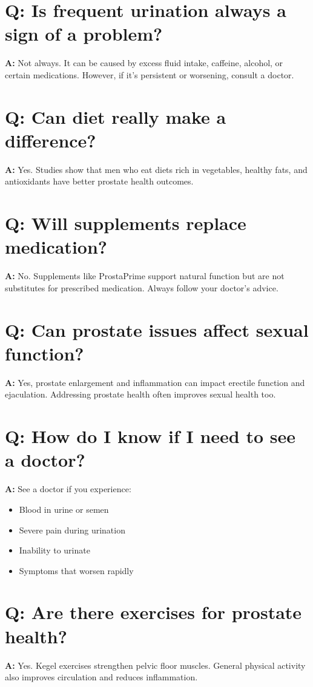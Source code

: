 \documentclass[11pt,oneside,openany]{book}
\begin{document}
\section*{Q: Is frequent urination always a sign of a problem?}
\textbf{A:} Not always. It can be caused by excess fluid intake, caffeine, alcohol, or certain medications. However, if it's persistent or worsening, consult a doctor.

\section*{Q: Can diet really make a difference?}
\textbf{A:} Yes. Studies show that men who eat diets rich in vegetables, healthy fats, and antioxidants have better prostate health outcomes.

\section*{Q: Will supplements replace medication?}
\textbf{A:} No. Supplements like ProstaPrime support natural function but are not substitutes for prescribed medication. Always follow your doctor's advice.

\section*{Q: Can prostate issues affect sexual function?}
\textbf{A:} Yes, prostate enlargement and inflammation can impact erectile function and ejaculation. Addressing prostate health often improves sexual health too.

\section*{Q: How do I know if I need to see a doctor?}
\textbf{A:} See a doctor if you experience:
\begin{itemize}[leftmargin=*]
\item Blood in urine or semen
\item Severe pain during urination
\item Inability to urinate
\item Symptoms that worsen rapidly
\end{itemize}

\section*{Q: Are there exercises for prostate health?}
\textbf{A:} Yes. Kegel exercises strengthen pelvic floor muscles. General physical activity also improves circulation and reduces inflammation.
\end{document}
